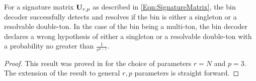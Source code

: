 \documentclass[conference,twocolumn]{IEEEtran}
\def\proofgap{-3ex}
\begin{document}
\begin{lemma}
\label{Lem:BinDecoderAnalysis}
For a signature matrix $\mathbf{U}_{r,p}$ as described in \eqref{Eqn:SignatureMatrix}, the bin decoder successfully detects and resolves if the bin is either a singleton or a resolvable double-ton. In the case of the bin being a multi-ton, the bin decoder declares a wrong hypothesis of either a singleton or a resolvable double-ton with a probability no greater than $\frac{1}{r^{p-1}}$.
\end{lemma}
\vspace{\proofgap}
\begin{proof}
This result was proved in \cite{lee2015saffron} for the choice of parameters $r=N$ and $p=3$. The extension of the result to general $r,p$ parameters is straight forward.
\end{proof}
\end{document}
